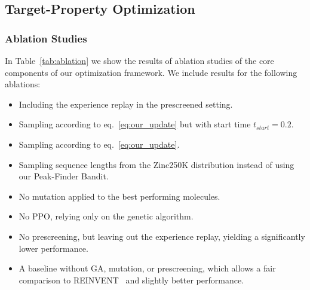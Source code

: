 \documentclass{article} %
\begin{document}
\subsection{Target-Property Optimization}
\subsubsection{Ablation Studies}\label{sec:ablation}
In Table~\ref{tab:ablation} we show the results of ablation studies of the core components of our optimization framework. We include results for the following ablations:
\begin{itemize}
    \item Including the experience replay in the prescreened setting.
    \item Sampling according to eq.~\ref{eq:our_update} but with start time $t_{start}=0.2$.
    \item Sampling according to eq.~\ref{eq:our_update}.
    \item Sampling sequence lengths from the Zinc250K distribution instead of using our Peak-Finder Bandit.
    \item No mutation applied to the best performing molecules.
    \item No PPO, relying only on the genetic algorithm.
    \item No prescreening, but leaving out the experience replay, yielding a significantly lower performance.
    \item A baseline without GA, mutation, or prescreening, which allows a fair comparison to REINVENT~\citep{olivecrona2017molecular} and slightly better performance.
\end{itemize}
\end{document}
